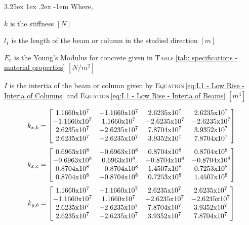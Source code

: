 \documentclass[11pt,a4paper,titlepage]{report}
\makeatletter
\renewcommand\paragraph{\@startsection{paragraph}{5}{\z@}%
  {3.25ex \@plus1ex \@minus.2ex}%
  {-1em}%
  {\normalfont\normalsize\bfseries}}
\makeatother
\begin{document}
\paragraph{}Where,
\begin{itemize}
\begin{small}
    \item $k$ is the stiffness $[N]$
    \item $l_1$ is the length of the beam or column in the studied direction $[m]$
    \item $E_c$ is the Young's Modulus for concrete given in \textsc{Table}\,\ref{tab: specifications - material properties} $[N/m^2]$
    \item $I$ is the intertia of the beam or column given by \textsc{Equation}\,\eqref{eq:I.1 - Low Rise - Interia of Columns} and \textsc{Equation}\,\eqref{eq:I.1 - Low Rise - Interia of Beams} $[m^4]$
\end{small}
\end{itemize}
\begin{equation}
k_{x,b}=
\left[
    \begin{matrix}
     1.1660$x$10^7 & -1.1660$x$10^7 & 2.6235$x$10^7 & 2.6235$x$10^7\\
   -1.1660$x$10^7 & 1.1660$x$10^7 & -2.6235$x$10^7 & -2.6235$x$10^7\\
    2.6235$x$10^7 & -2.6235$x$10^7 & 7.8704$x$10^7 & 3.9352$x$10^7\\
    2.6235$x$10^7 & -2.6235$x$10^7 & 3.9352$x$10^7 & 7.8704$x$10^7\\
    \end{matrix}
\right]
\label{eq:I.1 - kxb matrix}
\end{equation}
\begin{equation}
k_{x,c}=
\left[
    \begin{matrix}
     0.6963$x$10^8 & -0.6963$x$10^8 & 0.8704$x$10^8 & 0.8704$x$10^8\\
   -0.6963$x$10^8 & 0.6963$x$10^8 & -0.8704$x$10^8 & -0.8704$x$10^8\\
    0.8704$x$10^8 & -0.8704$x$10^8 & 1.4507$x$10^8 & 0.7253$x$10^8\\
    0.8704$x$10^8 & -0.8704$x$10^8 & 0.7253$x$10^8 & 1.4507$x$10^8\\
    \end{matrix}
\right]
\label{eq:I.1 - kxc matrix}
\end{equation}
\begin{equation}
k_{y,b}=
\left[
    \begin{matrix}
     1.1660$x$10^7 & -1.1660$x$10^7 & 2.6235$x$10^7 & 2.6235$x$10^7\\
   -1.1660$x$10^7 & 1.1660$x$10^7 & -2.6235$x$10^7 & -2.6235$x$10^7\\
    2.6235$x$10^7 & -2.6235$x$10^7 & 7.8704$x$10^7 & 3.9352$x$10^7\\
    2.6235$x$10^7 & -2.6235$x$10^7 & 3.9352$x$10^7 & 7.8704$x$10^7\\
    \end{matrix}
\right]
\label{eq:I.1 - kyb matrix}
\end{equation}
\end{document}
